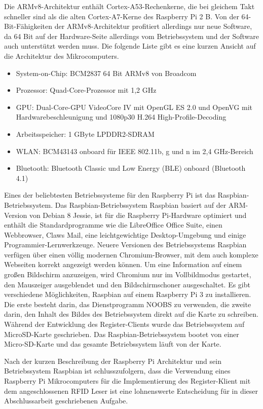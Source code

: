 Die ARMv8-Architektur enthält Cortex-A53-Rechenkerne, die bei gleichem Takt schneller sind als die alten Cortex-A7-Kerne des Raspberry Pi 2 B. Von der 64-Bit-Fähigkeiten der ARMv8-Architektur profitiert allerdings nur neue Software, da 64 Bit auf der Hardware-Seite allerdings vom Betriebssystem und der Software auch unterstützt werden muss. Die folgende Liste gibt es eine kurzen Ansicht auf die Architektur des Mikrocomputers.
\begin{itemize}
\item System-on-Chip: BCM2837 64 Bit ARMv8 von Broadcom
\item Prozessor: Quad-Core-Prozessor mit 1,2 GHz
\item GPU: Dual-Core-GPU VideoCore IV mit OpenGL ES 2.0 und OpenVG mit Hardwarebeschleunigung und 1080p30 H.264 High-Profile-Decoding
\item Arbeitsspeicher: 1 GByte LPDDR2-SDRAM
\item WLAN: BCM43143 onboard für IEEE 802.11b, g und n im 2,4 GHz-Bereich
\item Bluetooth: Bluetooth Classic und Low Energy (BLE) onboard (Bluetooth 4.1)  
\end{itemize}
Eines der beliebtesten Betriebssysteme für den Raspberry Pi ist das Raspbian-Betriebssystem. Das Raspbian-Betriebssystem Raspbian basiert auf der ARM-Version von Debian 8 Jessie, ist für die Raspberry Pi-Hardware optimiert  und enthält die Standardprogramme wie die LibreOffice Office Suite, einen Webbrowser, Claws Mail, eine leichtgewichtige Desktop-Umgebung und einige Programmier-Lernwerkzeuge. Neuere Versionen des Betriebssystems Raspbian verfügen über einen völlig modernen Chromium-Browser, mit dem auch komplexe Webseiten korrekt angezeigt werden können. Um eine Information auf einem großen Bildschirm anzuzeigen, wird Chromium nur im Vollbildmodus gestartet, den Mauszeiger ausgeblendet und den Bildschirmschoner ausgeschaltet. Es gibt verschiedene Möglichkeiten, Raspbian auf einem Raspberry Pi 3 zu installieren. Die erste besteht darin, das Dienstprogramm NOOBS zu verwenden, die zweite darin, den Inhalt des Bildes des Betriebssystem direkt auf die Karte zu schreiben. Während der Entwicklung des Register-Clients wurde das Betriebssystem auf MicroSD-Karte geschrieben. Das Raspbian-Betriebssystem bootet von einer Micro-SD-Karte und das gesamte Betriebssystem läuft von der Karte. 

Nach der kurzen Beschreibung der Raspberry Pi Architektur und sein Betriebssystem Raspbian ist schlusszufolgern, dass die Verwendung eines Raspberry Pi Mikrocomputers für die Implementierung des Register-Klient mit dem angeschlossenen RFID Leser ist eine lohnenswerte Entscheidung für in dieser Abschlussarbeit geschriebenen Aufgabe.  



